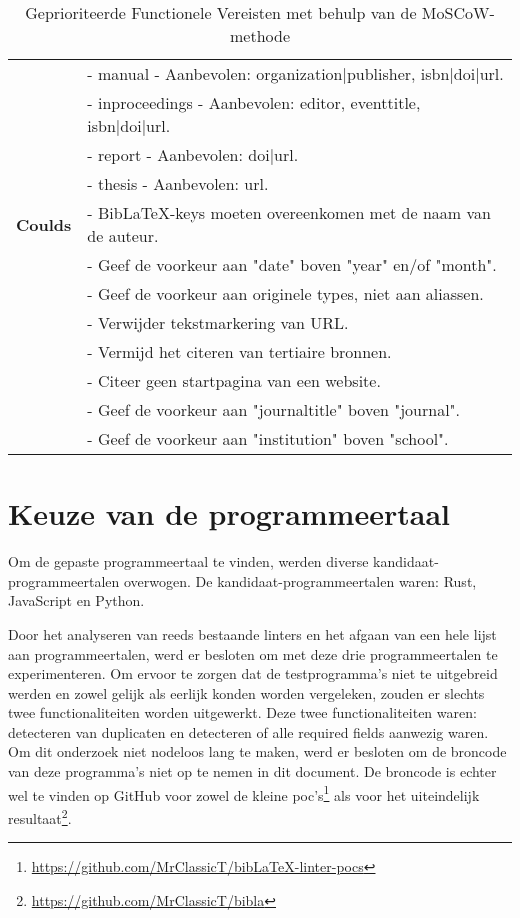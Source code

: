 \begin{table}[ht]
\begin{tabular}{p{2.5cm} p{13cm}}
        & - manual - Aanbevolen: organization|publisher, isbn|doi|url. \\
        & - inproceedings - Aanbevolen: editor, eventtitle, isbn|doi|url. \\
        & - report - Aanbevolen: doi|url. \\
        & - thesis - Aanbevolen: url. \\
        \midrule
        \textbf{Coulds} & 
          - BibLaTeX-keys moeten overeenkomen met de naam van de auteur. \\
        & - Geef de voorkeur aan "date" boven "year" en/of "month". \\
        & - Geef de voorkeur aan originele types, niet aan aliassen. \\
        & - Verwijder tekstmarkering van URL. \\
        & - Vermijd het citeren van tertiaire bronnen. \\
        & - Citeer geen startpagina van een website. \\
        & - Geef de voorkeur aan "journaltitle" boven "journal". \\
        & - Geef de voorkeur aan "institution" boven "school". \\
        \bottomrule
    \end{tabular}
    \caption{Geprioriteerde Functionele Vereisten met behulp van de MoSCoW-methode}
    \label{tab:functional_requirements}
    \end{table}


\section{Keuze van de programmeertaal}
Om de gepaste programmeertaal te vinden, werden diverse kandidaat-programmeertalen overwogen. De kandidaat-programmeertalen waren: Rust, JavaScript en Python.

Door het analyseren van reeds bestaande linters en het afgaan van een hele lijst aan programmeertalen, werd er besloten om met deze drie programmeertalen te experimenteren. Om ervoor te zorgen dat de testprogramma's niet te uitgebreid werden en zowel gelijk als eerlijk konden worden vergeleken, zouden er slechts twee functionaliteiten worden uitgewerkt. Deze twee functionaliteiten waren: detecteren van duplicaten en detecteren of alle required fields aanwezig waren. Om dit onderzoek niet nodeloos lang te maken, werd er besloten om de broncode van deze programma's niet op te nemen in dit document. De broncode is echter wel te vinden op GitHub voor zowel de kleine poc's\footnote{\url{https://github.com/MrClassicT/bibLaTeX-linter-pocs}} als voor het uiteindelijk resultaat\footnote{\url{https://github.com/MrClassicT/bibla}}.

